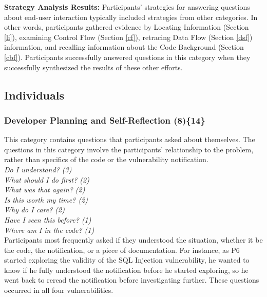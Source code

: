 \documentclass[10pt,journal,compsoc]{IEEEtran}
\begin{document}
\textbf{Strategy Analysis Results:}
Participants' strategies for answering questions about end-user interaction typically included strategies from other categories. In other words, participants gathered evidence by Locating Information (Section \ref{li}), examining Control Flow (Section \ref{cf}), retracing Data Flow (Section \ref{dsf}) information, and recalling information about the Code Background (Section \ref{cbf}). 
Participants successfully answered questions in this category when they successfully synthesized the results of these other efforts.





\subsection{Individuals}

\label{sec:results-i}

\subsubsection{Developer Planning and Self-Reflection (8)\{14\}}
\label{dpr}
 
This category contains questions that participants asked about themselves.
The questions in this category involve the participants' relationship to the problem, rather than specifics of the code or the vulnerability notification.
\\

\noindent\emph{Do I understand? (3)} \\
\emph{What should I do first? (2)} \\
\emph{What was that again? (2)} \\
\emph{Is this worth my time? (2)} \\
\emph{Why do I care? (2)} \\
\emph{Have I seen this before? (1)} \\
\emph{Where am I in the code? (1)} 
\\

Participants most frequently asked if they understood the situation, whether it be the code, the notification, or a piece of documentation. 
For instance, as P6 started exploring the validity of the SQL Injection vulnerability, he wanted to know if he fully understood the notification before he started exploring, so he went back to reread the notification before investigating further.
These questions occurred in all four vulnerabilities.
\end{document}
